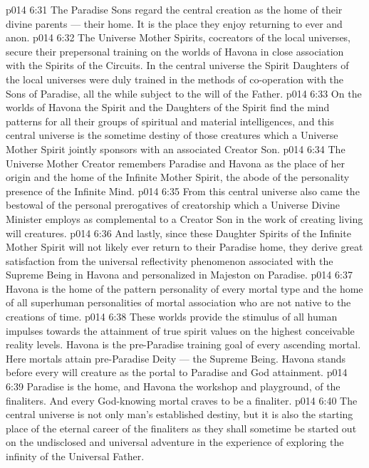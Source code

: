 \vs p014 6:31 The Paradise Sons regard the central creation as the home of their divine parents --- their home. It is the place they enjoy returning to ever and anon.
\vs p014 6:32 \bibnobreakspace {} The Universe Mother Spirits, cocreators of the local universes, secure their prepersonal training on the worlds of Havona in close association with the Spirits of the Circuits. In the central universe the Spirit Daughters of the local universes were duly trained in the methods of co\hyp{}operation with the Sons of Paradise, all the while subject to the will of the Father.
\vs p014 6:33 On the worlds of Havona the Spirit and the Daughters of the Spirit find the mind patterns for all their groups of spiritual and material intelligences, and this central universe is the sometime destiny of those creatures which a Universe Mother Spirit jointly sponsors with an associated Creator Son.
\vs p014 6:34 The Universe Mother Creator remembers Paradise and Havona as the place of her origin and the home of the Infinite Mother Spirit, the abode of the personality presence of the Infinite Mind.
\vs p014 6:35 From this central universe also came the bestowal of the personal prerogatives of creatorship which a Universe Divine Minister employs as complemental to a Creator Son in the work of creating living will creatures.
\vs p014 6:36 And lastly, since these Daughter Spirits of the Infinite Mother Spirit will not likely ever return to their Paradise home, they derive great satisfaction from the universal reflectivity phenomenon associated with the Supreme Being in Havona and personalized in Majeston on Paradise.
\vs p014 6:37 \bibnobreakspace {} Havona is the home of the pattern personality of every mortal type and the home of all superhuman personalities of mortal association who are not native to the creations of time.
\vs p014 6:38 These worlds provide the stimulus of all human impulses towards the attainment of true spirit values on the highest conceivable reality levels. Havona is the pre\hyp{}Paradise training goal of every ascending mortal. Here mortals attain pre\hyp{}Paradise Deity --- the Supreme Being. Havona stands before every will creature as the portal to Paradise and God attainment.
\vs p014 6:39 Paradise is the home, and Havona the workshop and playground, of the finaliters. And every God\hyp{}knowing mortal craves to be a finaliter.
\vs p014 6:40 The central universe is not only man’s established destiny, but it is also the starting place of the eternal career of the finaliters as they shall sometime be started out on the undisclosed and universal adventure in the experience of exploring the infinity of the Universal Father.
